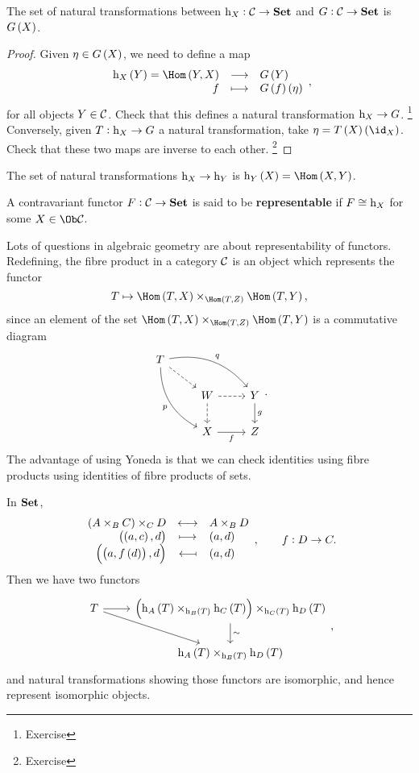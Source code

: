 \begin{lemma}
The set of natural transformations between $ \mathrm{h}_X : \mathcal{C} \to \textbf{Set} $ and $ G : \mathcal{C} \to \textbf{Set} $ is $ G\br{X} $.
\end{lemma}

\begin{proof}
Given $ \eta \in G\br{X} $, we need to define a map
$$ \function{\h_X\br{Y} = \Hom\br{Y, X}}{G\br{Y}}{f}{G\br{f}\br{\eta}}, $$
for all objects $ Y \in \mathcal{C} $. Check that this defines a natural transformation $ \mathrm{h}_X \to G $. \footnote{Exercise} Conversely, given $ T : \mathrm{h}_X \to G $ a natural transformation, take $ \eta = T\br{X}\br{\id_X} $. Check that these two maps are inverse to each other. \footnote{Exercise}
\end{proof}

\begin{corollary}
The set of natural transformations $ \mathrm{h}_X \to \mathrm{h}_Y $ is $ \h_Y\br{X} = \Hom\br{X, Y} $.
\end{corollary}

\pagebreak

\begin{definition*}
A contravariant functor $ F : \mathcal{C} \to \textbf{Set} $ is said to be \textbf{representable} if $ F \cong \mathrm{h}_X $ for some $ X \in \Ob \CCC $.
\end{definition*}

Lots of questions in algebraic geometry are about representability of functors. Redefining, the fibre product in a category $ \mathcal{C} $ is an object which represents the functor
$$ T \mapsto \Hom\br{T, X} \times_{\Hom\br{T, Z}} \Hom\br{T, Y}, $$
since an element of the set $ \Hom\br{T, X} \times_{\Hom\br{T, Z}} \Hom\br{T, Y} $ is a commutative diagram
$$
\begin{tikzcd}
T \arrow[dashed]{dr} \arrow[bend left=30]{drr}{q} \arrow[bend right=30]{ddr}[swap]{p} & & \\
& W \arrow[dashed]{r} \arrow[dashed]{d} & Y \arrow{d}{g} \\
& X \arrow{r}[swap]{f} & Z
\end{tikzcd}.
$$
The advantage of using Yoneda is that we can check identities using fibre products using identities of fibre products of sets.

\begin{example*}
In $ \textbf{Set} $,
$$ \bijection{\br{A \times_B C} \times_C D}{A \times_B D}{\br{\br{a, c}, d}}{\br{a, d}}{\br{\br{a, f\br{d}}, d}}{\br{a, d}}, \qquad f : D \to C. $$
Then we have two functors
$$
\begin{tikzcd}
T \arrow{r} \arrow{dr} & \br{\h_A\br{T} \times_{\h_B\br{T}} \h_C\br{T}} \times_{\h_C\br{T}} \h_D\br{T} \arrow{d}{\sim} \\
& \h_A\br{T} \times_{\h_B\br{T}} \h_D\br{T}
\end{tikzcd},
$$
and natural transformations showing those functors are isomorphic, and hence represent isomorphic objects.
\end{example*}

